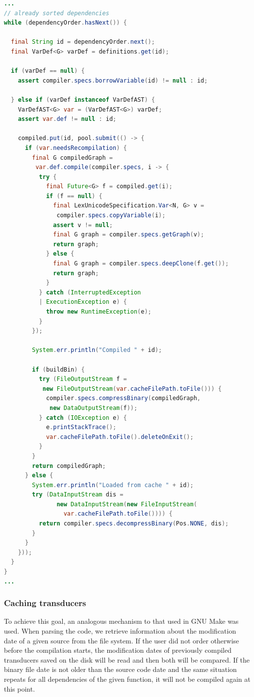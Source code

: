 \begin{lstlisting}[language=Java]
...
// already sorted dependencies
while (dependencyOrder.hasNext()) {

  final String id = dependencyOrder.next();
  final VarDef<G> varDef = definitions.get(id);

  if (varDef == null) {
    assert compiler.specs.borrowVariable(id) != null : id;

  } else if (varDef instanceof VarDefAST) {
    VarDefAST<G> var = (VarDefAST<G>) varDef;
    assert var.def != null : id;

    compiled.put(id, pool.submit(() -> {
      if (var.needsRecompilation) {
        final G compiledGraph =
         var.def.compile(compiler.specs, i -> {
          try {
            final Future<G> f = compiled.get(i);
            if (f == null) {
              final LexUnicodeSpecification.Var<N, G> v =
               compiler.specs.copyVariable(i);
              assert v != null;
              final G graph = compiler.specs.getGraph(v);
              return graph;
            } else {
              final G graph = compiler.specs.deepClone(f.get());
              return graph;
            }
          } catch (InterruptedException 
          | ExecutionException e) {
            throw new RuntimeException(e);
          }
        });

        System.err.println("Compiled " + id);

        if (buildBin) {
          try (FileOutputStream f =
           new FileOutputStream(var.cacheFilePath.toFile())) {
            compiler.specs.compressBinary(compiledGraph,
             new DataOutputStream(f));
          } catch (IOException e) {
            e.printStackTrace();
            var.cacheFilePath.toFile().deleteOnExit();
          }
        }
        return compiledGraph;
      } else {
        System.err.println("Loaded from cache " + id);
        try (DataInputStream dis =
               new DataInputStream(new FileInputStream(
                 var.cacheFilePath.toFile()))) {
          return compiler.specs.decompressBinary(Pos.NONE, dis);
        }
      }
    }));
  }
}
...
\end{lstlisting}

\hypertarget{caching-transducers}{%
\subsubsection{Caching transducers}\label{caching-transducers}}

To achieve this goal, an analogous mechanism to that used in
GNU Make was used. When parsing the code, we retrieve information about the
modification date of a given source from the file system. If the user
did not order otherwise before the compilation starts, the modification
dates of previously compiled transducers saved on the disk will be read
and then both will be compared. If the binary file date is not
older than the source code date and the same situation repeats for all
dependencies of the given function, it will not be compiled again at
this point.

